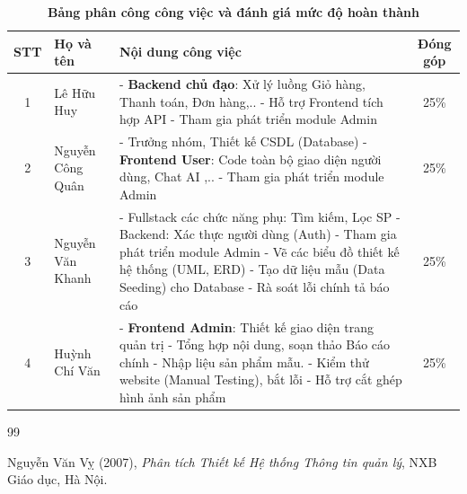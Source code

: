 \documentclass[a4paper]{article}
\begin{document}
\begin{table}[h!]
  \centering
  \caption{\textbf{Bảng phân công công việc và đánh giá mức độ hoàn thành}}
  \vspace{0.3cm}
  \begin{tabular}{|c|l|p{7.5cm}|c|}
    \hline
    \textbf{STT} & \textbf{Họ và tên} & \centering\textbf{Nội dung công việc} & \textbf{Đóng góp} \\
    \hline
    1 & Lê Hữu Huy & - \textbf{Backend chủ đạo}: Xử lý luồng Giỏ hàng, Thanh toán, Đơn hàng,.. \newline - Hỗ trợ Frontend tích hợp API \newline - Tham gia phát triển module Admin & 25\% \\
    \hline
    2 & Nguyễn Công Quân & - Trưởng nhóm, Thiết kế CSDL (Database) \newline - \textbf{Frontend User}: Code toàn bộ giao diện người dùng, Chat AI ,.. \newline - Tham gia phát triển module Admin & 25\% \\
    \hline
    3 & Nguyễn Văn Khanh & - Fullstack các chức năng phụ: Tìm kiếm, Lọc SP \newline - Backend: Xác thực người dùng (Auth) \newline - Tham gia phát triển module Admin
    - Vẽ các biểu đồ thiết kế hệ thống (UML, ERD) \newline - Tạo dữ liệu mẫu (Data Seeding) cho Database \newline - Rà soát lỗi chính tả báo cáo & 25\% \\
    \hline
    4 & Huỳnh Chí Văn & - \textbf{Frontend Admin}: Thiết kế giao diện trang quản trị \newline - Tổng hợp nội dung, soạn thảo Báo cáo chính \newline - Nhập liệu sản phẩm 
    mẫu. \newline - Kiểm thử website (Manual Testing), bắt lỗi \newline - Hỗ trợ cắt ghép hình ảnh sản phẩm  & 25\% \\
    \hline
  \end{tabular}
\end{table}


\newpage
{}
\renewcommand{\refname}{Tài liệu tham khảo}
\begin{thebibliography}{99}

Nguyễn Văn Vỵ (2007), \textit{Phân tích Thiết kế Hệ thống Thông tin quản lý}, NXB Giáo dục, Hà Nội.

\end{thebibliography}
\end{document}
